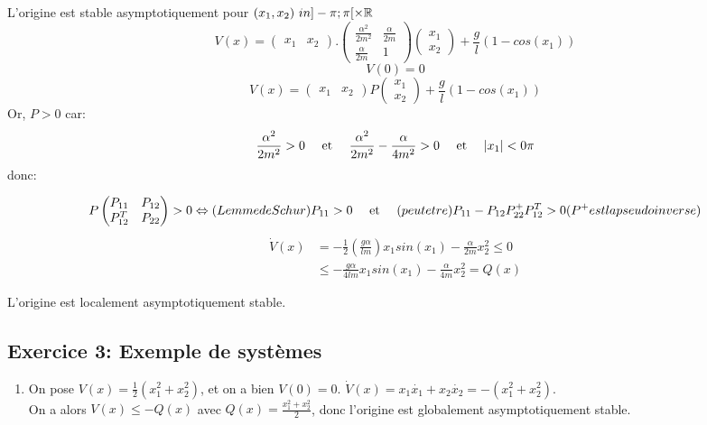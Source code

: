 \documentclass{../../td}
\begin{document}
\begin{enumerate}
\begin{enumerate}
L'origine est stable asymptotiquement pour $(x_1,x_2) \ in ]-\pi ; \pi[\times \mathbb{R}$
\[
V(x) = \begin{pmatrix}
x_1 & x_2\end{pmatrix}. \begin{pmatrix}
\frac{\alpha^2}{2m^2} & \frac{\alpha}{2m} \\ \frac{\alpha}{2m} & 1 \end{pmatrix} \begin{pmatrix}
x_1 \\x_2
\end{pmatrix} + \frac{g}{l}(1-cos(x_1))\]
\[V(0) = 0\]
\[V(x) = \begin{pmatrix}
x_1 & x_2\end{pmatrix} P \begin{pmatrix}
x_1 \\ x_2
\end{pmatrix} + \frac{g}{l}(1 - cos(x_1))\]
Or, $P >0$ car:
\[\frac{\alpha^2}{2m^2}>0 \quad\text{ et }\quad \frac{\alpha^2}{2m^2} - \frac{\alpha}{4m^2}>0 \quad\text{ et }\quad |x_1| < 0\pi\]
donc:

\[P \begin{pmatrix}
P_{11} & P_{12} \\
P_{12}^T & P_{22}
\end{pmatrix} >0 \Leftrightarrow (Lemme de Schur) P_{11} >0 \quad\text{ et }\quad (peutetre) P_{11} - P_{12}P_{22}^+P_{12}^T
 >0 (P^+ est la pseudo inverse)
\]
\begin{align*}
\dot{V}(x) &= -\frac{1}{2}(\frac{g\alpha}{lm})x_1 sin(x_1) - \frac{\alpha}{2m} x_2^2  \leq 0\\
&\leq -\frac{g\alpha}{4lm} x_1sin(x_1) - \frac{\alpha}{4m}x_2^2 = Q(x)
\end{align*}

L'origine est localement asymptotiquement stable.
\end{enumerate}


\subsection*{Exercice 3: Exemple de systèmes}

\begin{enumerate}
\item \begin{enumerate}
On pose $V(x) = \frac{1}{2}(x_1^2 + x_2^2)$, et on a bien $V(0) = 0$.
$\dot{V}(x) = x_1\dot{x_1} + x_2 \dot{x_2} = -(x_1^2 + x_2^2)$.\\
On a alors $V(x) \leq -Q(x)$ avec $Q(x) = \frac{x_1^2 + x_2^2}{2}$, donc l'origine est globalement asymptotiquement stable.\\


\end{enumerate}
\end{enumerate}
\end{enumerate}
\end{document}
